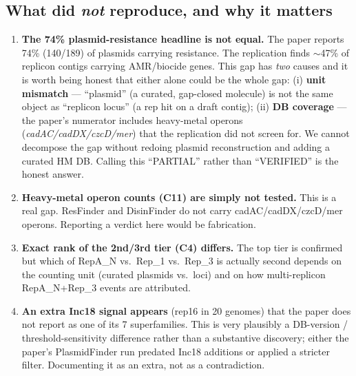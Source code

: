\documentclass[11pt]{article}
\begin{document}
\subsection{What did \emph{not} reproduce, and why it matters}
\begin{enumerate}[leftmargin=1.5em]
  \item \textbf{The 74\% plasmid-resistance headline is not equal.}
  The paper reports 74\% (140/189) of plasmids carrying resistance. The
  replication finds $\sim$47\% of replicon contigs carrying AMR/biocide
  genes. This gap has \emph{two} causes and it is worth being honest that
  either alone could be the whole gap: (i) \textbf{unit mismatch} ---
  ``plasmid'' (a curated, gap-closed molecule) is not the same object as
  ``replicon locus'' (a rep hit on a draft contig); (ii) \textbf{DB
  coverage} --- the paper's numerator includes heavy-metal operons
  (\emph{cadAC/cadDX/czcD/mer}) that the replication did not screen for.
  We cannot decompose the gap without redoing plasmid reconstruction and
  adding a curated HM DB. Calling this ``PARTIAL'' rather than
  ``VERIFIED'' is the honest answer.
  \item \textbf{Heavy-metal operon counts (C11) are simply not tested.}
  This is a real gap. ResFinder and DisinFinder do not carry
  cadAC/cadDX/czcD/mer operons. Reporting a verdict here would be
  fabrication.
  \item \textbf{Exact rank of the 2nd/3rd tier (C4) differs.} The top
  tier is confirmed but which of RepA\_N vs.\ Rep\_1 vs.\ Rep\_3 is
  actually second depends on the counting unit (curated plasmids vs.\ loci)
  and on how multi-replicon RepA\_N+Rep\_3 events are attributed.
  \item \textbf{An extra Inc18 signal appears} (rep16 in 20 genomes) that
  the paper does not report as one of its 7 superfamilies. This is very
  plausibly a DB-version / threshold-sensitivity difference rather than a
  substantive discovery; either the paper's PlasmidFinder run predated
  Inc18 additions or applied a stricter filter. Documenting it as an
  extra, not as a contradiction.
\end{enumerate}
\end{document}
